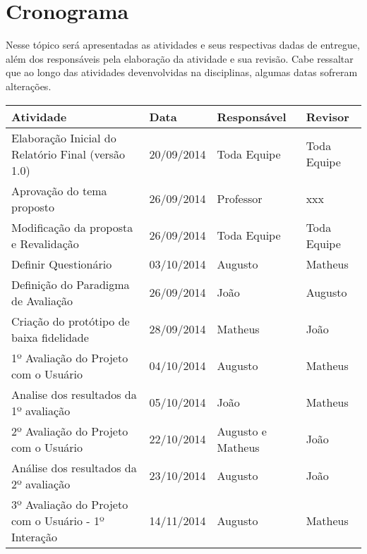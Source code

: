 \chapter[Cronograma]{Cronograma}
\label{chap:cronograma}
	Nesse tópico será apresentadas as atividades e seus respectivas dadas de entregue, além dos responsáveis pela elaboração da atividade e sua revisão. Cabe ressaltar que ao longo das atividades devenvolvidas na disciplinas, algumas datas sofreram alterações.
	
	\label{subsubsec:cronograma_talbe}
		\begin{table}[h]
			\centering
			\begin{tabular}{|p{6.5cm}|p{2.5cm}|p{2.5cm}|p{2.5cm}|}
				\hline
				
				Atividade & Data & Responsável & Revisor \\ \hline
				
				Elaboração Inicial do Relatório Final (versão 1.0) & 20/09/2014 & Toda Equipe & Toda Equipe \\ \hline
				
				Aprovação do tema proposto & 26/09/2014 & Professor & xxx \\ \hline
				
				Modificação da proposta e Revalidação & 26/09/2014 & Toda Equipe & Toda Equipe  \\ \hline

				Definir Questionário & 03/10/2014 & Augusto & Matheus \\ \hline

				Definição do Paradigma de Avaliação & 26/09/2014 & João & Augusto \\ \hline

				Criação do protótipo de baixa fidelidade & 28/09/2014 & Matheus & João \\ \hline

				1º Avaliação do Projeto com o Usuário & 04/10/2014 & Augusto & Matheus \\ \hline

				Analise dos resultados da 1º avaliação & 05/10/2014 & João & Matheus \\ \hline

				2º Avaliação do Projeto com o Usuário & 22/10/2014 & Augusto e Matheus & João \\ \hline

				Análise dos resultados da 2º avaliação & 23/10/2014 & Augusto & João \\ \hline

				3º Avaliação do Projeto com o Usuário - 1º Interação & 14/11/2014 & Augusto & Matheus \\ \hline


\end{tabular}
\end{table}

